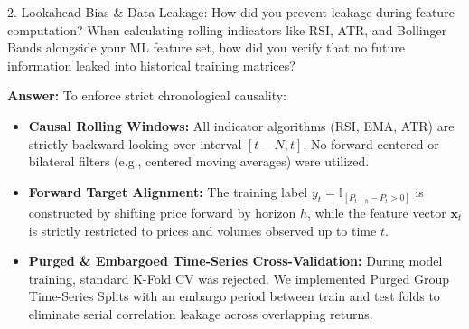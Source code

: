 \documentclass[11pt,a4paper]{article}
\begin{document}
\begin{questionbox}{2. Lookahead Bias \& Data Leakage: How did you prevent leakage during feature computation?}
When calculating rolling indicators like RSI, ATR, and Bollinger Bands alongside your ML feature set, how did you verify that no future information leaked into historical training matrices?
\end{questionbox}
\begin{answerbox}
\textbf{Answer:} To enforce strict chronological causality:
\begin{itemize}[leftmargin=1.5em]
  \item \textbf{Causal Rolling Windows:} All indicator algorithms (RSI, EMA, ATR) are strictly backward-looking over interval $[t-N, t]$. No forward-centered or bilateral filters (e.g., centered moving averages) were utilized.
  \item \textbf{Forward Target Alignment:} The training label $y_t = \mathbb{I}_{[P_{t+h} - P_t > 0]}$ is constructed by shifting price forward by horizon $h$, while the feature vector $\mathbf{x}_t$ is strictly restricted to prices and volumes observed up to time $t$.
  \item \textbf{Purged \& Embargoed Time-Series Cross-Validation:} During model training, standard K-Fold CV was rejected. We implemented Purged Group Time-Series Splits with an embargo period between train and test folds to eliminate serial correlation leakage across overlapping returns.
\end{itemize}
\end{answerbox}

\vspace{0.4em}
\end{document}
